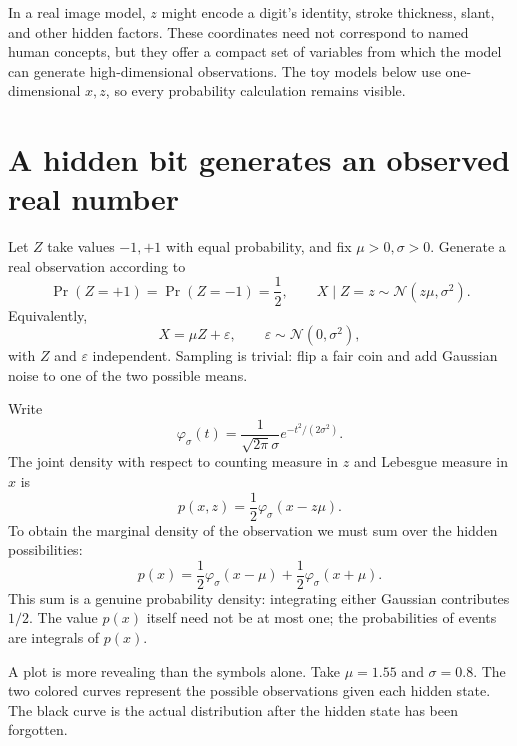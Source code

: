 In a real image model, \(z\) might encode a digit's identity, stroke thickness, slant, and other hidden factors. These coordinates need not correspond to named human concepts, but they offer a compact set of variables from which the model can generate high-dimensional observations. The toy models below use one-dimensional \(x,z\), so every probability calculation remains visible.

\section{A hidden bit generates an observed real number}

Let \(Z\) take values \(-1,+1\) with equal probability, and fix \(\mu>0,\sigma>0\). Generate a real observation according to
\[
 \Pr(Z=+1)=\Pr(Z=-1)=\frac12,\qquad
 X\mid Z=z\sim\mathcal N(z\mu,\sigma^2).
\]
Equivalently,
\[
 X=\mu Z+\varepsilon,\qquad
 \varepsilon\sim\mathcal N(0,\sigma^2),
\]
with \(Z\) and \(\varepsilon\) independent. Sampling is trivial: flip a fair coin and add Gaussian noise to one of the two possible means.

Write
\[
 \varphi_\sigma(t)=\frac{1}{\sqrt{2\pi}\sigma}
                   e^{-t^2/(2\sigma^2)}.
\]
The joint density with respect to counting measure in \(z\) and Lebesgue measure in \(x\) is
\[
 p(x,z)=\frac12\varphi_\sigma(x-z\mu).
\]
To obtain the marginal density of the observation we must sum over the hidden possibilities:
\[
 \boxed{p(x)=\frac12\varphi_\sigma(x-\mu)
                +\frac12\varphi_\sigma(x+\mu).}
\]
This sum is a genuine probability density: integrating either Gaussian contributes \(1/2\). The value \(p(x)\) itself need not be at most one; the probabilities of events are integrals of \(p(x)\).


A plot is more revealing than the symbols alone. Take \(\mu=1.55\) and \(\sigma=0.8\). The two colored curves represent the possible observations given each hidden state. The black curve is the actual distribution after the hidden state has been forgotten.

